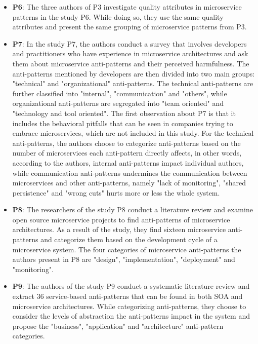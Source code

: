 \documentclass{Configuration_Files/PoliMi3i_thesis}
\begin{document}
\begin{itemize}
    \item \textbf{P6}: The three authors of P3 investigate quality attributes in microservice patterns in the study P6.
    While doing so, they use the same quality attributes and present the same grouping of microservice patterns from P3.
    
    \item \textbf{P7}: In the study P7, the authors conduct a survey that involves developers and practitioners who have experience in microservice architectures and ask them about microservice anti-patterns and their perceived harmfulness.
    The anti-patterns mentioned by developers are then divided into two main groups: "technical" and "organizational" anti-patterns.
    The technical anti-patterns are further classified into "internal", "communication" and "others", while organizational anti-patterns are segregated into "team oriented" and "technology and tool oriented".
    The first observation about P7 is that it includes the behavioral pitfalls that can be seen in companies trying to embrace microservices, which are not included in this study.
    For the technical anti-patterns, the authors choose to categorize anti-patterns based on the number of microservices each anti-pattern directly affects, in other words, according to the authors, internal anti-patterns impact individual authors, while communication anti-patterns undermines the communication between microservices and other anti-patterns, namely "lack of monitoring", "shared persistence" and "wrong cuts" hurts more or less the whole system.
    
    \item \textbf{P8}: The researchers of the study P8 conduct a literature review and examine open source microservice projects to find anti-patterns of microservice architectures.
    As a result of the study, they find sixteen microservice anti-patterns and categorize them based on the development cycle of a microservice system.
    The four categories of microservice anti-patterns the authors present in P8 are "design", "implementation", "deployment" and "monitoring".
    
    \item \textbf{P9}: The authors of the study P9 conduct a systematic literature review and extract 36 service-based anti-patterns that can be found in both SOA and microservice architectures.
    While categorizing anti-patterns, they choose to consider the levels of abstraction the anti-patterns impact in the system and propose the "business", "application" and "architecture" anti-pattern categories.
    

\end{itemize}
\end{document}
